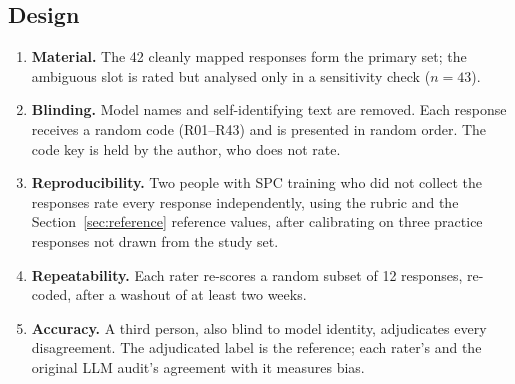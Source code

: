 \documentclass[11pt]{article}
\begin{document}
\subsection{Design}
\begin{enumerate}[leftmargin=*]
\item \textbf{Material.} The 42 cleanly mapped responses form the primary set; the ambiguous slot is rated but analysed only in a sensitivity check ($n=43$).
\item \textbf{Blinding.} Model names and self-identifying text are removed. Each response receives a random code (R01--R43) and is presented in random order. The code key is held by the author, who does not rate.
\item \textbf{Reproducibility.} Two people with SPC training who did not collect the responses rate every response independently, using the rubric and the Section~\ref{sec:reference} reference values, after calibrating on three practice responses not drawn from the study set.
\item \textbf{Repeatability.} Each rater re-scores a random subset of 12 responses, re-coded, after a washout of at least two weeks.
\item \textbf{Accuracy.} A third person, also blind to model identity, adjudicates every disagreement. The adjudicated label is the reference; each rater's and the original LLM audit's agreement with it measures bias.
\end{enumerate}
\end{document}
